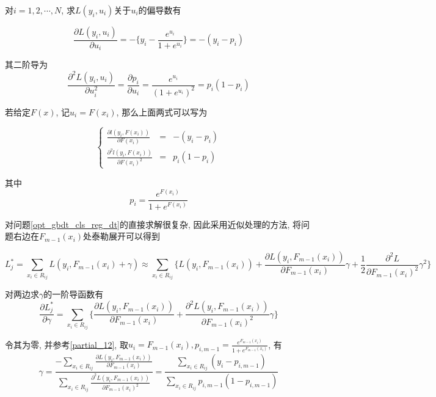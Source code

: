 \begin{remark}
    对$i=1,2,\cdots, N$, 求$L(y_i, u_i)$关于$u_i$的偏导数有

    \begin{equation}
        \frac{\partial L(y_i, u_i)}{\partial u_i} = -\Big\{y_i - \frac{e^{u_i}}{1 + e^{u_i}} \Big\} =  -(y_i - p_i)
    \end{equation}

    其二阶导为
    \begin{equation}
        \frac{\partial^2 L(y_i, u_i)}{\partial u_i^2} = \frac{\partial p_i}{\partial u_i} = \frac{e^{u_i}}{(1 + e^{u_i})^2} = p_i(1-p_i)
    \end{equation}

    若给定$F(x)$, 记$u_i=F(x_i)$, 那么上面两式可以写为

    \begin{equation}\label{partial_12}
        \left\{
        \begin{array}{rcl}
            \frac{\partial l(y_i, F(x_i))}{\partial F(x_i)}     & = & -(y_i - p_i) \\
            \frac{\partial^2 l(y_i, F(x_i))}{\partial F(x_i)^2} & = & p_i(1-p_i)
        \end{array}
        \right.
    \end{equation}

    其中
    \begin{equation*}
        p_i = \frac{e^{F(x_i)}}{1 + e^{F(x_i)}}
    \end{equation*}

\end{remark}

\begin{remark}
    对问题\ref{opt_gbdt_cls_reg_dt}的直接求解很复杂, 因此采用近似处理的方法, 将问题右边在$F_{m-1}(x_i)$处泰勒展开可以得到

    \begin{equation*}
        L_j^* =\sum_{x_i\in R_{ij}}L(y_i, F_{m-1}(x_i) + \gamma) \approx \sum_{x_i\in R_{ij}}\Big\{L(y_i, F_{m-1}(x_i)) + \frac{\partial L(y_i, F_{m-1}(x_i))}{\partial F_{m-1}(x_i)}\gamma + \frac{1}{2}\frac{\partial^2 L}{\partial F_{m-1}(x_i)^2}\gamma^2\Big\}
    \end{equation*}

    对两边求$\gamma$的一阶导函数有
    \begin{equation*}
        \frac{\partial L_j^*}{\partial \gamma} = \sum_{x_i\in R_{ij}} \Big\{\frac{\partial L(y_i, F_{m-1}(x_i))}{\partial F_{m-1}(x_i)} + \frac{\partial^2 L(y_i, F_{m-1}(x_i))}{\partial F_{m-1}(x_i)^2}\gamma\Big\}
    \end{equation*}

    令其为零, 并参考\ref{partial_12}, 取$u_i=F_{m-1}(x_i), p_{i, m-1} = \frac{e^{F_{m-1}(x_i)}}{1 + e^{F_{m-1}(x_i)} }$, 有
    \begin{equation}
        \gamma = \frac{-\sum_{x_i\in R_{ij}}\frac{\partial L(y_i, F_{m-1}(x_i))}{\partial F_{m-1}(x_i)}}{\sum_{x_i\in R_{ij}}\frac{\partial^2 L(y_i, F_{m-1}(x_i))}{\partial F_{m-1}(x_i)^2}} = \frac{\sum_{x_i\in R_{ij}}(y_i-p_{i, m-1})}{\sum_{x_i\in R_{ij}}p_{i, m-1}(1-p_{i, m-1})}
    \end{equation}

\end{remark}
